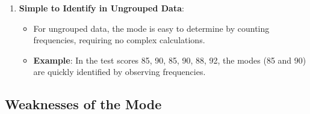 \documentclass[11pt]{article}
\begin{document}
\begin{enumerate}
    \item \textbf{Simple to Identify in Ungrouped Data}:
    \begin{itemize}
        \item For ungrouped data, the mode is easy to determine by counting frequencies, requiring no complex calculations.
        \item \textbf{Example}: In the test scores 85, 90, 85, 90, 88, 92, the modes (85 and 90) are quickly identified by observing frequencies.
    \end{itemize}
\end{enumerate}

\subsection*{Weaknesses of the Mode}
\end{document}
